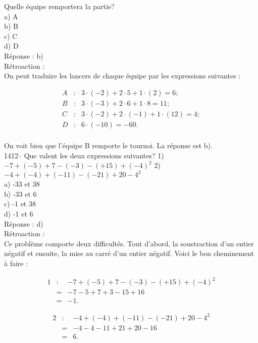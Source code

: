 Quelle \'equipe remportera la partie?\\
a) A\\
b) B\\
c) C\\
d) D\\

R\'eponse : b)\\

R\'etroaction :\\
On peut traduire les lancers de chaque \'equipe par les expressions
suivantes :

\begin{eqnarray*}
A&:& 3\cdot(-2)+2\cdot5+1\cdot(2)=6; \\
B&:& 3\cdot(-3)+2\cdot6+1\cdot8=11;\\
C&:& 3\cdot(-2)+2\cdot(-1)+1\cdot(12)=4;\\
D&:& 6\cdot(-10)=-60.\\
\end{eqnarray*}

On voit bien que l'\'equipe B remporte le tournoi. La r\'eponse est b).\\

1412-- Que valent les deux expressions suivantes? \vskip 10pt 1)
$-7+(-5)+7-(-3)-(+15)+(-4)^2$ \vskip 10pt
2)  $-4+(-4)+(-11)-(-21)+20-4^2$\\

a) -33 et 38\\
b) -33 et 6\\
c) -1 et 38\\
d) -1 et 6\\

R\'eponse : d)\\

R\'etroaction :\\
Ce probl\`eme comporte deux difficult\'es. Tout d'abord, la
soustraction d'un entier n\'egatif et ensuite, la mise au carr\'e
d'un entier n\'egatif. Voici le bon cheminement \`a faire :

\begin{eqnarray*}
1&:&-7+(-5)+7-(-3)-(+15)+(-4)^2 \\ &=& -7-5+7+3-15+16 \\ &=& -1.
\end{eqnarray*}

\begin{eqnarray*}
2&:&-4+(-4)+(-11)-(-21)+20-4^2 \\ &=& -4-4-11+21+20-16 \\ &=& 6.
\end{eqnarray*}

